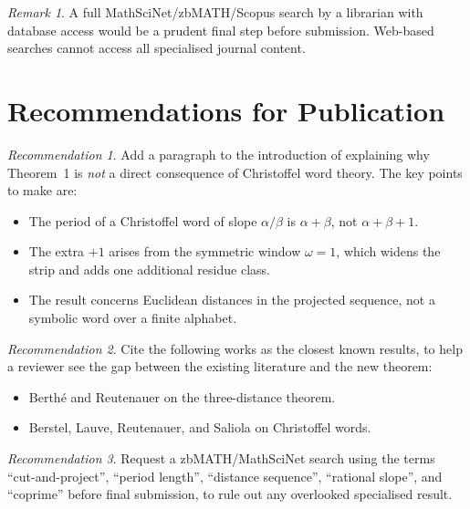 \documentclass[11pt]{article}
\theoremstyle{plain}
\theoremstyle{remark}
\newtheorem{remark}{Remark}
\newtheorem{recommendation}{Recommendation}
\begin{document}
\begin{remark}
    A full MathSciNet/zbMATH/Scopus search by a librarian with database access would
    be a prudent final step before submission.
    Web-based searches cannot access all specialised journal content.
\end{remark}

\section{Recommendations for Publication}

\begin{recommendation}
Add a paragraph to the introduction of \cite{Kunert2025proof} explaining why
Theorem~1 is \emph{not} a direct consequence of Christoffel word theory.
The key points to make are:
\begin{itemize}
    \item The period of a Christoffel word of slope $\alpha/\beta$ is $\alpha + \beta$,
          not $\alpha + \beta + 1$.
    \item The extra $+1$ arises from the symmetric window $\omega = 1$, which widens
          the strip and adds one additional residue class.
    \item The result concerns Euclidean distances in the projected sequence, not a
          symbolic word over a finite alphabet.
\end{itemize}
\end{recommendation}

\begin{recommendation}
Cite the following works as the closest known results, to help a reviewer see the gap
between the existing literature and the new theorem:
\begin{itemize}
    \item Berth\'{e} and Reutenauer \cite{BertheReutenauer2024} on the three-distance
          theorem.
    \item Berstel, Lauve, Reutenauer, and Saliola \cite{BerstelEtAl2008} on
          Christoffel words.
\end{itemize}
\end{recommendation}

\begin{recommendation}
Request a zbMATH/MathSciNet search using the terms
``cut-and-project'', ``period length'', ``distance sequence'',
``rational slope'', and ``coprime''
before final submission, to rule out any overlooked specialised result.
\end{recommendation}
\end{document}
